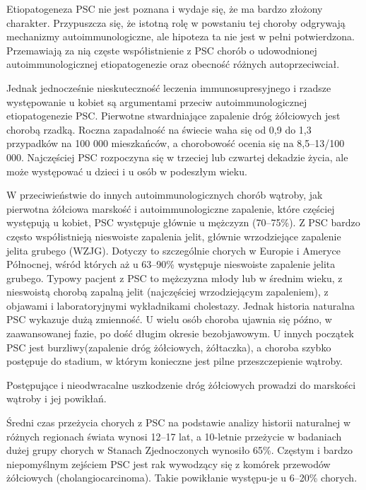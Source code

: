Etiopatogeneza  PSC  nie  jest  poznana i wydaje się, że ma bardzo złożony charakter. 
Przypuszcza się, że istotną rolę w powstaniu tej choroby odgrywają mechanizmy autoimmunologiczne, ale hipoteza ta nie jest w pełni potwierdzona.  
Przemawiają  za  nią  częste  współistnienie z PSC chorób o udowodnionej autoimmunologicznej  etiopatogenezie  oraz  obecność  różnych  autoprzeciwciał.  

Jednak  jednocześnie  nieskuteczność  leczenia  immunosupresyjnego i rzadsze występowanie u kobiet są argumentami  przeciw  autoimmunologicznej etiopatogenezie  PSC.
Pierwotne  stwardniające  zapalenie  dróg żółciowych jest chorobą rzadką. 
Roczna zapadalność na świecie waha się od 0,9 do 1,3 przypadków na 100 000 mieszkańców, a chorobowość ocenia się na 8,5–13/100 000. 
Najczęściej PSC  rozpoczyna  się  w  trzeciej  lub  czwartej dekadzie życia, ale może występować u dzieci i u osób w podeszłym wieku. 

W przeciwieństwie  do  innych  autoimmunologicznych chorób wątroby, jak pierwotna żółciowa marskość i autoimmunologiczne zapalenie, które częściej  występują  u  kobiet,  PSC  występuje głównie u mężczyzn (70–75\%).
Z  PSC  bardzo  często  współistnieją  nieswoiste  zapalenia  jelit,  głównie  wrzodziejące zapalenie jelita grubego (WZJG). 
Dotyczy to szczególnie chorych w Europie i Ameryce Północnej, wśród których aż u 63–90\% występuje nieswoiste zapalenie jelita grubego.
Typowy pacjent z PSC to mężczyzna młody lub w średnim wieku, z nieswoistą chorobą zapalną jelit (najczęściej wrzodziejącym zapaleniem), z objawami i laboratoryjnymi wykładnikami cholestazy. 
Jednak historia naturalna  PSC  wykazuje  dużą  zmienność.  
U  wielu osób choroba ujawnia się późno, w zaawansowanej fazie, po dość długim okresie bezobjawowym. 
U innych początek PSC jest burzliwy(zapalenie dróg żółciowych, żółtaczka), a choroba szybko postępuje do stadium, w którym konieczne jest pilne przeszczepienie wątroby.

Postępujące  i  nieodwracalne  uszkodzenie dróg żółciowych prowadzi do marskości wątroby  i  jej  powikłań.  

Średni  czas  przeżycia  chorych z PSC na podstawie analizy historii naturalnej  w  różnych  regionach  świata  wynosi 12–17 lat, a 10-letnie przeżycie w badaniach dużej grupy chorych w Stanach Zjednoczonych wynosiło 65\%. 
Częstym i bardzo niepomyślnym zejściem PSC jest rak wywodzący się z komórek przewodów żółciowych (cholangiocarcinoma).  
Takie  powikłanie  występu-je u 6–20\% chorych. 

